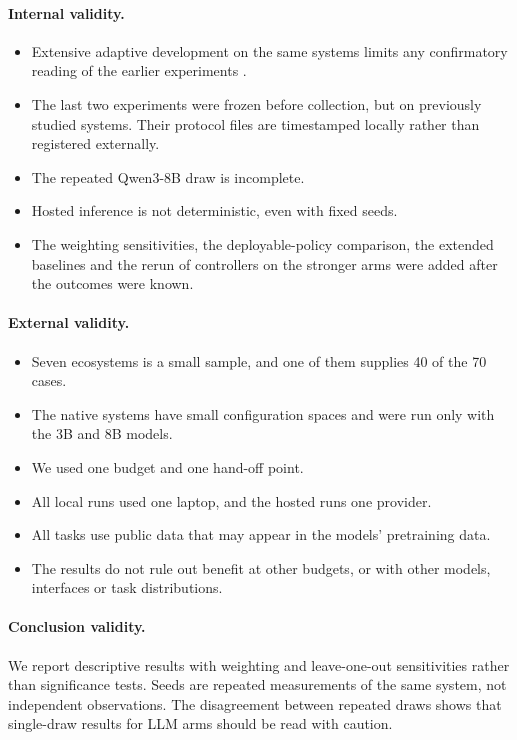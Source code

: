 \paragraph{Internal validity.}
\begin{itemize}
  \item Extensive adaptive development on the same systems limits any confirmatory reading of the earlier experiments \cite{gelman2014forking}.
  \item The last two experiments were frozen before collection, but on previously studied systems. Their protocol files are timestamped locally rather than registered externally.
  \item The repeated Qwen3-8B draw is incomplete.
  \item Hosted inference is not deterministic, even with fixed seeds.
  \item The weighting sensitivities, the deployable-policy comparison, the extended baselines and the rerun of controllers on the stronger arms were added after the outcomes were known.
\end{itemize}

\paragraph{External validity.}
\begin{itemize}
  \item Seven ecosystems is a small sample, and one of them supplies 40 of the 70 cases.
  \item The native systems have small configuration spaces and were run only with the 3B and 8B models.
  \item We used one budget and one hand-off point.
  \item All local runs used one laptop, and the hosted runs one provider.
  \item All tasks use public data that may appear in the models' pretraining data.
  \item The results do not rule out benefit at other budgets, or with other models, interfaces or task distributions.
\end{itemize}

\paragraph{Conclusion validity.} We report descriptive results with weighting and leave-one-out sensitivities rather than significance tests. Seeds are repeated measurements of the same system, not independent observations. The disagreement between repeated draws shows that single-draw results for LLM arms should be read with caution.

